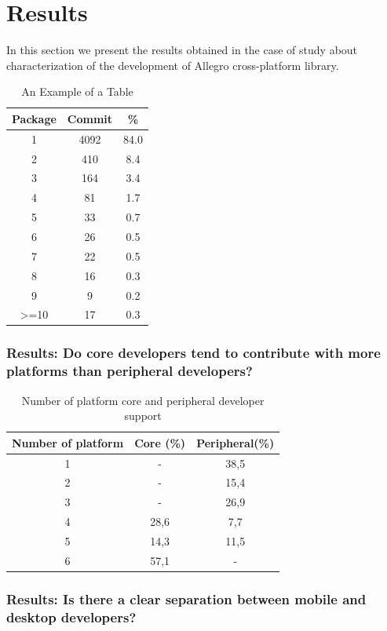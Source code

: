 \documentclass[10pt, conference]{IEEEtran}
\begin{document}
\section{Results}
In this section we present the results obtained in the case of study about characterization of the development of Allegro cross-platform library.

\begin{table}[h]
\renewcommand{\arraystretch}{1.3}
\caption{An Example of a Table}
\label{table_example2}
\centering
\begin{tabular}{|c|c|c|}
\hline
 Package & Commit & \%\\
\hline
1&		4092&	84.0\\
2&		410&	8.4\\
3&		164& 	3.4\\
4&		81&		1.7\\
5&		33&		0.7\\
6&		26&		0.5\\
7&		22&		0.5\\
8&		16&		0.3\\
9&		9&		0.2\\
>=10&	17&		0.3\\

\hline
\end{tabular}
\end{table}

\subsubsection{Results: Do core developers tend to contribute with more platforms than peripheral developers?}

\begin{table}[h]
\renewcommand{\arraystretch}{1.3}
\caption{Number of platform core and peripheral developer support}
\label{plat}
\centering
\begin{tabular}{|c|c|c|}
\hline
Number of platform & Core (\%) & Peripheral(\%)\\
\hline
1 & -&38,5 \\
\hline
2 & -&15,4\\
\hline
3 &- &26,9\\
\hline
4 & 28,6&7,7\\
\hline
5 & 14,3&11,5  \\
\hline
6 & 57,1& -  \\
\hline
\end{tabular}
\end{table} 

\subsubsection{Results: Is there a clear separation between mobile and desktop developers?}
\end{document}
